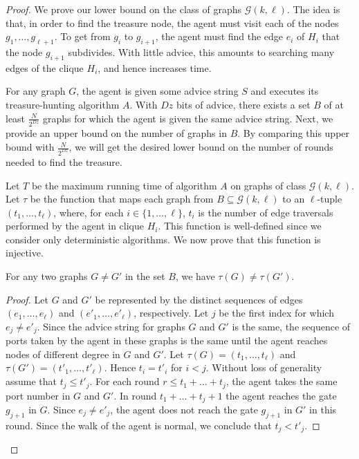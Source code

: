 \documentclass{llncs}
\newcommand{\classletter}{\ensuremath{\mathcal{G}}}
\newcommand{\ourclass}{\ensuremath{\classletter (k,\ell)}}
\newcommand{\treasure}{\ensuremath{g_{\ell+1}}}
\begin{document}
\begin{proof}
  


We prove our lower bound on the class of graphs $\ourclass$. The idea is that, in order to find the treasure node, the agent must visit each of the nodes $g_1,\ldots,\treasure$. To get from $g_i$ to $g_{i+1}$, the agent must find the edge $e_i$ of $H_i$ that the node $g_{i+1}$ subdivides. With little advice, this amounts to searching many edges of the clique $H_i$, and hence increases time.

For any graph $G$, the agent is given some advice string $S$ and executes its treasure-hunting algorithm $A$. 
With $Dz$ bits of advice, there exists a set $B$ of at least $\frac{N}{2^{Dz}}$ graphs for which the agent is given the same advice string. Next, we provide an upper bound on the number of graphs in $B$.  By comparing this upper bound with $\frac{N}{2^{Dz}}$, we will get the desired lower bound on the number of rounds needed to find the treasure.


Let $T$ be the maximum running time of algorithm $A$ on  graphs of class $\ourclass$. 
Let $\tau$ be the function that maps each graph from $B \subseteq \ourclass$ to an $\ell$-tuple $(t_1,\ldots,t_\ell)$, where, for each $i \in \{1,\ldots,\ell\}$, $t_i$ is the number of edge traversals performed by the agent in clique $H_i$. This function is well-defined since we consider only deterministic algorithms. We now prove that this function is injective.

\begin{claim}\label{injective}
For any two graphs $G \neq G'$ in the set $B$, we have $\tau(G) \neq \tau(G')$.
\end{claim}
\begin{proof}
Let $G$ and $G'$ be represented by the  distinct sequences of edges $(e_1,\ldots,e_\ell)$ and $(e'_1,\ldots,e'_\ell)$, respectively.
Let $j$ be the first index for which $e_j\neq e'_j$. Since the advice string for graphs $G$ and $G'$ is the same, the sequence of ports taken by the agent in these graphs
is the same until the agent reaches nodes of different degree in $G$ and $G'$. Let  $\tau(G)=(t_1,\ldots,t_\ell)$ and  $\tau(G')=(t'_1,\ldots,t'_\ell)$.
Hence $t_i=t'_i$ for $i<j$. Without loss of generality assume that $t_j \leq t'_j$. For each round $r\leq t_1+\dots + t_j$, the agent  takes the same port number in $G$ and $G'$. In round $t_1+\dots + t_j+1$ the agent reaches the gate $g_{j+1}$ in $G$. Since $e_j\neq e'_j$, the agent does not reach the gate  $g_{j+1}$ in $G'$ in this round. Since the walk of the agent is normal, we conclude that
$t_j<t'_j$.  
\end{proof}


\end{proof}
\end{document}
